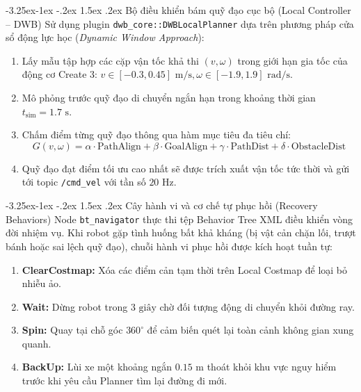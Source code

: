 \documentclass[11pt,a4paper]{article}
\makeatletter
\renewcommand{\subsection}{\@startsection{subsection}{2}{\z@}%
  {-3.25ex\@plus -1ex \@minus -.2ex}%
  {1.5ex \@plus .2ex}%
  {\normalfont\large\bfseries\color{secondary}}}
\makeatother
\begin{document}
\subsection{Bộ điều khiển bám quỹ đạo cục bộ (Local Controller -- DWB)}
Sử dụng plugin \texttt{dwb\_core::DWBLocalPlanner} dựa trên phương pháp cửa sổ động lực học (\textit{Dynamic Window Approach}):
\begin{enumerate}
  \item Lấy mẫu tập hợp các cặp vận tốc khả thi $(v, \omega)$ trong giới hạn gia tốc của động cơ Create 3: $v \in [-0.3, 0.45]\text{ m/s}, \omega \in [-1.9, 1.9]\text{ rad/s}$.
  \item Mô phỏng trước quỹ đạo di chuyển ngắn hạn trong khoảng thời gian $t_{\text{sim}} = 1.7\text{ s}$.
  \item Chấm điểm từng quỹ đạo thông qua hàm mục tiêu đa tiêu chí:
  \begin{equation}
    G(v, \omega) = \alpha \cdot \text{PathAlign} + \beta \cdot \text{GoalAlign} + \gamma \cdot \text{PathDist} + \delta \cdot \text{ObstacleDist}
  \end{equation}
  \item Quỹ đạo đạt điểm tối ưu cao nhất sẽ được trích xuất vận tốc tức thời và gửi tới topic \texttt{/cmd\_vel} với tần số $20\text{ Hz}$.
\end{enumerate}

\subsection{Cây hành vi và cơ chế tự phục hồi (Recovery Behaviors)}
Node \texttt{bt\_navigator} thực thi tệp Behavior Tree XML điều khiển vòng đời nhiệm vụ. Khi robot gặp tình huống bất khả kháng (bị vật cản chặn lối, trượt bánh hoặc sai lệch quỹ đạo), chuỗi hành vi phục hồi được kích hoạt tuần tự:
\begin{enumerate}
  \item \textbf{ClearCostmap:} Xóa các điểm cản tạm thời trên Local Costmap để loại bỏ nhiễu ảo.
  \item \textbf{Wait:} Dừng robot trong $3\text{ giây}$ chờ đối tượng động di chuyển khỏi đường ray.
  \item \textbf{Spin:} Quay tại chỗ góc $360^\circ$ để cảm biến quét lại toàn cảnh không gian xung quanh.
  \item \textbf{BackUp:} Lùi xe một khoảng ngắn $0.15\text{ m}$ thoát khỏi khu vực nguy hiểm trước khi yêu cầu Planner tìm lại đường đi mới.
\end{enumerate}
\end{document}
